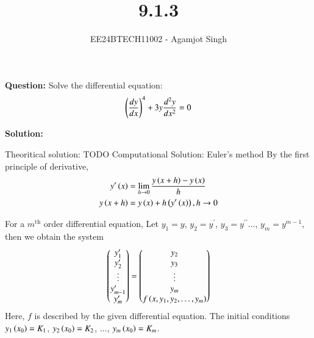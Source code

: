 \documentclass[journal]{IEEEtran}
\begin{document}

\vspace{3cm}

\title{9.1.3}
\author{EE24BTECH11002 - Agamjot Singh}
{\let\newpage\relax\maketitle}

\renewcommand{\thefigure}{\theenumi}
\renewcommand{\thetable}{\theenumi}
\setlength{\intextsep}{10pt} %

\textbf{Question:}
\newline
Solve the differential equation:
\begin{align}
    \left(\frac{dy}{dx}\right)^4 + 3y{\frac{d^2 y}{d x^2}} = 0
\end{align}

\textbf{Solution:}

Theoritical solution:
TODO
\newline
Computational Solution: Euler's method
\newline
By the first principle of derivative,
\begin{align}
    y^{\prime}\left(x\right) &= \lim_{h\to0} \frac{y\left(x + h\right) - y\left(x\right)}{h}\\
    y\left(x + h\right) &= y\left(x\right) + h\left(y^{\prime}\left(x\right)\right), h\to0
\end{align}

For a $m^{\text{th}}$ order differential equation,
\newline
Let $y_1 = y$, $y_2 = y^{\prime}$, $y_3 = y^{\prime\prime} \dots$, $y_m = y^{m - 1}$, then we obtain the system
\begin{align}
    \begin{pmatrix}y_1^{\prime}\\y_2^{\prime}\\\vdots\\y_{m - 1}^{\prime}\\y_m^{\prime}\end{pmatrix} = \begin{pmatrix}y_2\\y_3\\\vdots\\y_m\\f\left(x, y_1, y_2,\dots,y_m\right)\end{pmatrix}
\end{align}
Here, $f$ is described by the given differential equation. The initial conditions $y_1\left(x_0\right) = K_1$, $y_2\left(x_0\right) = K_2$, $\dots$, $y_m\left(x_0\right) = K_m$.
\end{document}
